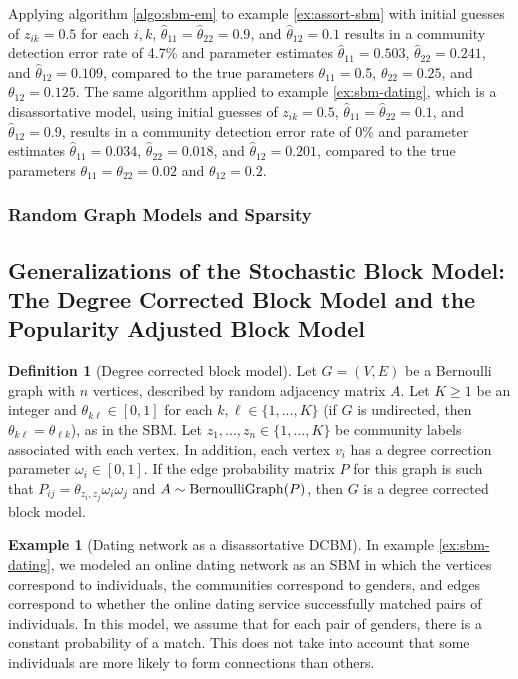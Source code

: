 \documentclass[
  11pt,
]{article}
\theoremstyle{definition}
\newtheorem{definition}{Definition}[section]
\theoremstyle{definition}
\newtheorem{example}{Example}[section]
\theoremstyle{definition}
\theoremstyle{definition}
\theoremstyle{remark}
\begin{document}
Applying algorithm \ref{algo:sbm-em} to example \ref{ex:assort-sbm} with initial guesses of \(z_{ik} = 0.5\) for each \(i, k\), \(\hat{\theta}_{11} = \hat{\theta}_{22} = 0.9\), and \(\hat{\theta}_{12} = 0.1\) results in a community detection error rate of 4.7\% and parameter estimates \(\hat{\theta}_{11} = 0.503\), \(\hat{\theta}_{22} = 0.241\), and \(\hat{\theta}_{12} = 0.109\), compared to the true parameters \(\theta_{11} = 0.5\), \(\theta_{22} = 0.25\), and \(\theta_{12} = 0.125\).
The same algorithm applied to example \ref{ex:sbm-dating}, which is a disassortative model, using initial guesses of \(z_{ik} = 0.5\), \(\hat{\theta}_{11} = \hat{\theta}_{22} = 0.1\), and \(\hat{\theta}_{12} = 0.9\), results in a community detection error rate of 0\% and parameter estimates \(\hat{\theta}_{11} = 0.034\), \(\hat{\theta}_{22} = 0.018\), and \(\hat{\theta}_{12} = 0.201\), compared to the true parameters \(\theta_{11} = \theta_{22} = 0.02\) and \(\theta_{12} = 0.2\).

\hypertarget{random-graph-models-and-sparsity}{%
\subsubsection{Random Graph Models and Sparsity}\label{random-graph-models-and-sparsity}}

\hypertarget{sec:dcbm-pabm}{%
\subsection{Generalizations of the Stochastic Block Model: The Degree Corrected Block Model and the Popularity Adjusted Block Model}\label{sec:dcbm-pabm}}

\begin{definition}[Degree corrected block model]
\label{def:dcbm}
Let $G = (V, E)$ be a Bernoulli graph with $n$ vertices, described by random adjacency matrix $A$. 
Let $K \geq 1$ be an integer and $\theta_{k \ell} \in [0, 1]$ for each $k, \ell \in \{1, ..., K\}$ (if $G$ is undirected, then $\theta_{k \ell} = \theta_{\ell k}$), as in the SBM. 
Let $z_1, ..., z_n \in \{1, ..., K\}$ be community labels associated with each vertex. 
In addition, each vertex $v_i$ has a degree correction parameter $\omega_i \in [0, 1]$. 
If the edge probability matrix $P$ for this graph is such that $P_{ij} = \theta_{z_i, z_j} \omega_i \omega_j$ and $A \sim \mathrm{BernoulliGraph}(P)$, then $G$ is a degree corrected block model.
\end{definition}

\begin{example}[Dating network as a disassortative DCBM]
\label{ex:dcbm-dating}
In example \ref{ex:sbm-dating}, we modeled an online dating network as an SBM in which the vertices correspond to individuals, the communities correspond to genders, and edges correspond to whether the online dating service successfully matched pairs of individuals. 
In this model, we assume that for each pair of genders, there is a constant probability of a match. 
This does not take into account that some individuals are more likely to form connections than others. 

\end{example}
\end{document}
